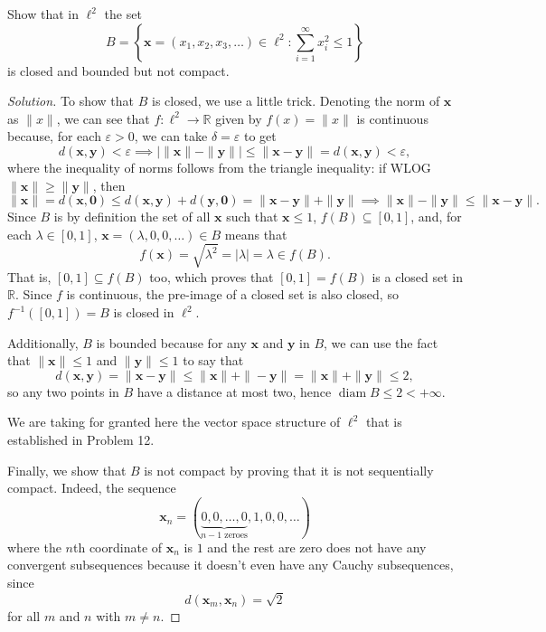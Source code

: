 \documentclass[11pt]{scrartcl}
\providecommand{\eps}{\varepsilon}
\providecommand{\RR}{\mathbb R}
\providecommand{\inv}{^{-1}}
\providecommand{\mb}[1]{\mathbf{#1}}
\newenvironment{soln}{\begin{proof}[Solution]}{\end{proof}}
\providecommand{\abs}[1]{\left|#1\right|}
\begin{document}
\setcounter{problem}{10}

\begin{problem}
	Show that in $\ell^2$ the set
	\[B = \left\{\mb x = (x_1, x_2, x_3, \dots) \in\ell^2 :
	\sum_{i=1}^{\infty}x_i^2 \le 1\right\}\]
	is closed and bounded but not compact.
\end{problem}

\begin{soln}
	To show that $B$ is closed, we use a little trick.
	Denoting the norm of $\mb x$ as $\|x\|$, we can see that
	$f\colon \ell^2\to \RR$ given by $f(x) = \|x\|$
	is continuous because, for each $\eps > 0$,
	we can take $\delta = \eps$ to get
	\[d(\mb x, \mb y) < \eps \implies
	\abs{\|\mb x\| - \|\mb y\|} \le \|\mb x - \mb y\| = d(\mb x,\mb y) < \eps,\]
	where the inequality of norms follows from the triangle inequality:
	if WLOG $\|\mb x\| \ge \|\mb y\|$, then
	\[\|\mb x\| = d(\mb x,\mb 0) \le d(\mb x, \mb y) + d(\mb y, \mb 0)
	= \|\mb x - \mb y\| + \|\mb y\| \implies
	\|\mb x\| - \|\mb y\| \le \|\mb x-\mb y\|.\]
	Since $B$ is by definition the set of all $\mb x$ such that $\mb x \le 1$,
	$f(B)\subseteq[0,1]$, and, for each $\lambda\in[0,1]$,
	$\mb x = (\lambda, 0,0,\dots)\in B$ means that
	\[f(\mb x) = \sqrt{\lambda^2} = |\lambda| = \lambda \in f(B).\]
	That is, $[0,1]\subseteq f(B)$ too, which proves that
	$[0,1] = f(B)$ is a closed set in $\RR$.
	Since $f$ is continuous, the pre-image of a closed set
	is also closed, so $f\inv([0,1]) = B$ is closed in $\ell^2$.
	
	Additionally, $B$ is bounded because for any $\mb x$ and $\mb y$ in $B$,
	we can use the fact that $\|\mb x\| \le 1$ and $\|\mb y\|\le 1$ to say that
	\[d(\mb x, \mb y) = \|\mb x - \mb y\|\le \|\mb x\| + \|-\mb y\|
	= \|\mb x\| + \|\mb y\| \le 2,\]
	so any two points in $B$ have a distance at most two,
	hence $\operatorname{diam} B \le 2 < +\infty$.
	
	\begin{remark}
		We are taking for granted here the vector space structure of $\ell^2$
		that is established in Problem 12.
	\end{remark}

	Finally, we show that $B$ is not compact by proving that
	it is not sequentially compact.
	Indeed, the sequence
	\[\mb x_n =
	(\underbrace{0, 0, \dots, 0}_{n-1\text{ zeroes}}, 1, 0, 0, \dots)\]
	where the $n$th coordinate of $\mb x_n$ is $1$
	and the rest are zero does not have any convergent subsequences
	because it doesn't even have any Cauchy subsequences, since
	\[d(\mb x_m, \mb x_n) = \sqrt2\]
	for all $m$ and $n$ with $m\ne n$.
\end{soln}
\end{document}
